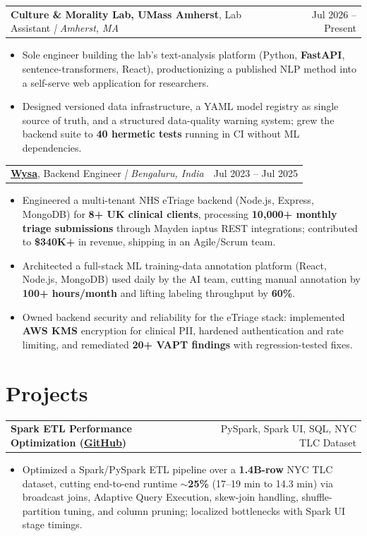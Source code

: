 \documentclass[letterpaper,11pt]{article}
\makeatletter
\newcommand{\expItem}[4]{%
  \vspace{2pt}
  \begin{tabular*}{\textwidth}{@{}l@{\extracolsep{\fill}}r@{}}
    \textbf{#1}, #2 \textit{| #3} & #4 \\
  \end{tabular*}\par\vspace{-3pt}
}
\newcommand{\projItem}[2]{%
  \vspace{2pt}
  \begin{tabular*}{\textwidth}{@{}l@{\extracolsep{\fill}}r@{}}
    \textbf{#1} & #2 \\
  \end{tabular*}\par\vspace{-3pt}
}
\makeatother
\begin{document}
\expItem{Culture \& Morality Lab, UMass Amherst}{Lab Assistant}{Amherst, MA}{Jul 2026 -- Present}
\begin{itemize}
  \item Sole engineer building the lab's text-analysis platform (Python, \textbf{FastAPI}, sentence-transformers, React), productionizing a published NLP method into a self-serve web application for researchers.
  \item Designed versioned data infrastructure, a YAML model registry as single source of truth, and a structured data-quality warning system; grew the backend suite to \textbf{40 hermetic tests} running in CI without ML dependencies.
\end{itemize}

\expItem{\href{https://www.wysa.io}{Wysa}}{Backend Engineer}{Bengaluru, India}{Jul 2023 -- Jul 2025}
\begin{itemize}
  \item Engineered a multi-tenant NHS eTriage backend (Node.js, Express, MongoDB) for \textbf{8+ UK clinical clients}, processing \textbf{10{,}000+ monthly triage submissions} through Mayden iaptus REST integrations; contributed to \textbf{\$340K+} in revenue, shipping in an Agile/Scrum team.
  \item Architected a full-stack ML training-data annotation platform (React, Node.js, MongoDB) used daily by the AI team, cutting manual annotation by \textbf{100+ hours/month} and lifting labeling throughput by \textbf{60\%}.
  \item Owned backend security and reliability for the eTriage stack: implemented \textbf{AWS KMS} encryption for clinical PII, hardened authentication and rate limiting, and remediated \textbf{20+ VAPT findings} with regression-tested fixes.
\end{itemize}

\section{Projects}

\projItem{Spark ETL Performance Optimization {\normalfont\small(\href{https://github.com/Deva-1903/Spark-ETL-Optimization}{GitHub})}}{PySpark, Spark UI, SQL, NYC TLC Dataset}
\begin{itemize}
  \item Optimized a Spark/PySpark ETL pipeline over a \textbf{1.4B-row} NYC TLC dataset, cutting end-to-end runtime \textbf{$\sim$25\%} (17--19 min to 14.3 min) via broadcast joins, Adaptive Query Execution, skew-join handling, shuffle-partition tuning, and column pruning; localized bottlenecks with Spark UI stage timings.
\end{itemize}
\end{document}
